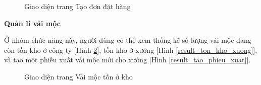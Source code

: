 \begin{figure}[H]
    \begin{center}
        \caption{Giao diện trang Tạo đơn đặt hàng}
        \label{result_tao_don_hang}
    \end{center}
\end{figure}

\textbf{Quản lí vải mộc}

Ở nhóm chức năng này, người dùng có thể xem thống kê số lượng vải mộc đang còn tồn kho ở công ty [Hình \ref{result_moc_ton_kho}], tồn kho ở xưởng [Hình \ref{result_ton_kho_xuong}], và tạo một phiếu xuất vải mộc mới cho xưởng [Hình \ref{result_tao_phieu_xuat}].

\begin{figure}[H]
    \begin{center}
        \caption{Giao diện trang Vải mộc tồn ở kho}
        \label{result_moc_ton_kho}
    \end{center}
\end{figure}

